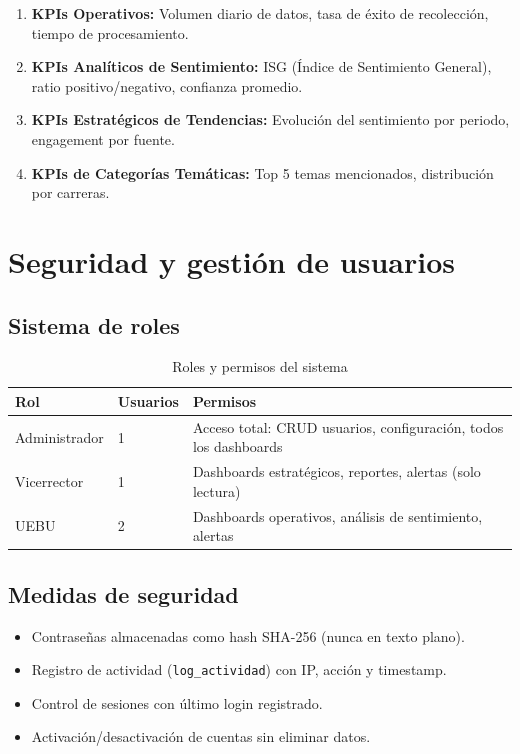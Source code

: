 \documentclass[11pt,a4paper]{article}
\begin{document}
\begin{enumerate}
  \item \textbf{KPIs Operativos:} Volumen diario de datos, tasa de éxito de recolección, tiempo de procesamiento.
  \item \textbf{KPIs Analíticos de Sentimiento:} ISG (Índice de Sentimiento General), ratio positivo/negativo, confianza promedio.
  \item \textbf{KPIs Estratégicos de Tendencias:} Evolución del sentimiento por periodo, engagement por fuente.
  \item \textbf{KPIs de Categorías Temáticas:} Top 5 temas mencionados, distribución por carreras.
\end{enumerate}

\section{Seguridad y gestión de usuarios}

\subsection{Sistema de roles}

\begin{table}[H]
\centering
\begin{tabularx}{\textwidth}{l l X}
\toprule
\textbf{Rol} & \textbf{Usuarios} & \textbf{Permisos} \\
\midrule
Administrador & 1 & Acceso total: CRUD usuarios, configuración, todos los dashboards \\
\rowcolor{tablerow}
Vicerrector & 1 & Dashboards estratégicos, reportes, alertas (solo lectura) \\
UEBU & 2 & Dashboards operativos, análisis de sentimiento, alertas \\
\bottomrule
\end{tabularx}
\caption{Roles y permisos del sistema}
\end{table}

\subsection{Medidas de seguridad}

\begin{itemize}
  \item Contraseñas almacenadas como hash SHA-256 (nunca en texto plano).
  \item Registro de actividad (\texttt{log\_actividad}) con IP, acción y timestamp.
  \item Control de sesiones con último login registrado.
  \item Activación/desactivación de cuentas sin eliminar datos.
\end{itemize}
\end{document}
